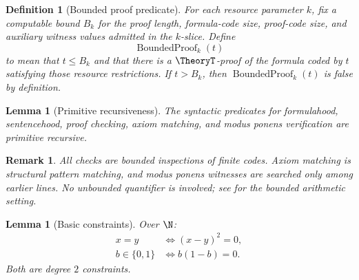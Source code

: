\documentclass[letterpaper,10pt]{article}
\theoremstyle{upright}
\theoremstyle{upright}
\newtheorem{remark}[theorem]{Remark}
\newtheorem{definition}[theorem]{Definition}
\newtheorem{lemma}[theorem]{Lemma}
\begin{document}
\begin{definition}[Bounded proof predicate]
\label{def:bounded-proof-predicate}
	For each resource parameter $k$, fix a computable bound $B_k$ for the proof length, formula-code size, proof-code size, and auxiliary witness values admitted in the $k$-slice. Define
	\begin{equation}
		\operatorname{BoundedProof}_k(t)
	\end{equation}
	to mean that $t\leq B_k$ and that there is a $\TheoryT$-proof of the formula coded by $t$ satisfying those resource restrictions. If $t>B_k$, then $\operatorname{BoundedProof}_k(t)$ is false by definition.
\end{definition}

\begin{lemma}[Primitive recursiveness]
\label{lem:syntactic-prim-rec}
	The syntactic predicates for formulahood, sentencehood, proof checking, axiom matching, and modus ponens verification are primitive recursive.
\end{lemma}

\begin{remark}
	All checks are bounded inspections of finite codes. Axiom matching is structural pattern matching, and modus ponens witnesses are searched only among earlier lines. No unbounded quantifier is involved; see \citet{hajekpudlak93,boolos07} for the bounded arithmetic setting.
\end{remark}

\begin{lemma}[Basic constraints]
\label{lem:basic-constraints}
	Over $\N$:
	\begin{align}
		x=y &\iff (x-y)^2=0,\\
		b\in\{0,1\} &\iff b(1-b)=0.
	\end{align}
	Both are degree $2$ constraints.
\end{lemma}
\end{document}

